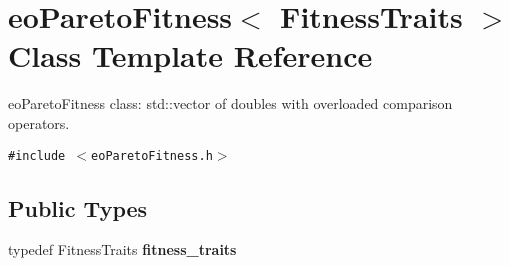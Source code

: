 \section{eo\-Pareto\-Fitness$<$ Fitness\-Traits $>$ Class Template Reference}
\label{classeo_pareto_fitness}
eo\-Pareto\-Fitness class: std::vector of doubles with overloaded comparison operators.  


{\tt \#include $<$eo\-Pareto\-Fitness.h$>$}

\subsection*{Public Types}
\begin{CompactItemize}
\item 
typedef Fitness\-Traits {\bf fitness\_\-traits}\label{classeo_pareto_fitness_w0}

\end{CompactItemize}
